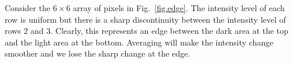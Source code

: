 
Consider the $6\times 6$ array of pixels in Fig.~\ref{fig.edge}. The intensity level of each row is uniform but there is a sharp discontinuity between the intensity level of rows $2$ and $3$. Clearly, this represents an edge between the dark area at the top and the light area at the bottom. Averaging will make the intensity change smoother and we lose the sharp change at the edge.

